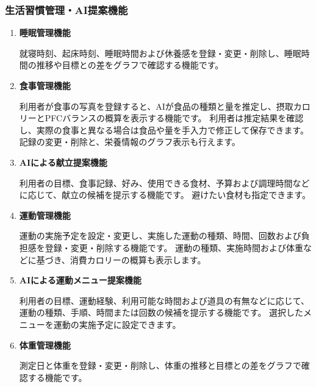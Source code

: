 \documentclass[uplatex,dvipdfmx]{jlreq}
\begin{document}
\subsubsection{生活習慣管理・AI提案機能}
\begin{enumerate}

\item \textbf{睡眠管理機能}

就寝時刻、起床時刻、睡眠時間および休養感を登録・変更・削除し、睡眠時間の推移や目標との差をグラフで確認する機能です。

\item \textbf{食事管理機能}

利用者が食事の写真を登録すると、AIが食品の種類と量を推定し、摂取カロリーとPFCバランスの概算を表示する機能です。
利用者は推定結果を確認し、実際の食事と異なる場合は食品や量を手入力で修正して保存できます。記録の変更・削除と、栄養情報のグラフ表示も行えます。

\item \textbf{AIによる献立提案機能}

利用者の目標、食事記録、好み、使用できる食材、予算および調理時間などに応じて、献立の候補を提示する機能です。
避けたい食材も指定できます。

\item \textbf{運動管理機能}

運動の実施予定を設定・変更し、実施した運動の種類、時間、回数および負担感を登録・変更・削除する機能です。
運動の種類、実施時間および体重などに基づき、消費カロリーの概算も表示します。

\item \textbf{AIによる運動メニュー提案機能}

利用者の目標、運動経験、利用可能な時間および道具の有無などに応じて、運動の種類、手順、時間または回数の候補を提示する機能です。
選択したメニューを運動の実施予定に設定できます。

\item \textbf{体重管理機能}

測定日と体重を登録・変更・削除し、体重の推移と目標との差をグラフで確認する機能です。
\end{enumerate}
\end{document}
